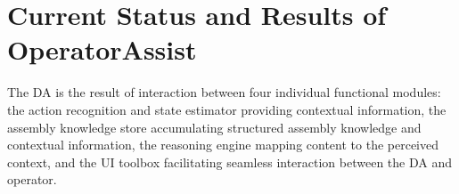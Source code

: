 \section{Current Status and Results of OperatorAssist}\label{sec:Results}

The DA is the result of interaction between four individual functional modules: the action recognition and state estimator providing contextual information, the assembly knowledge store accumulating structured assembly knowledge and contextual information, the reasoning engine mapping content to the perceived context, and the UI toolbox facilitating seamless interaction between the DA and operator.





